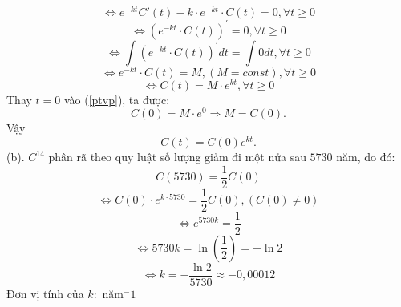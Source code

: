 \documentclass[12pt,a4paper]{article}
\begin{document}
\[ \Leftrightarrow {e^{ - kt}}C'\left( t \right) - k \cdot {e^{ - kt}} \cdot C\left( t \right) = 0,\forall t \ge 0\]
\[ \Leftrightarrow {\left( {{e^{ - kt}} \cdot C\left( t \right)} \right)^\prime } = 0,\forall t \ge 0\]
\[ \Leftrightarrow \int {{{\left( {{e^{ - kt}} \cdot C\left( t \right)} \right)}^\prime }dt = \int {0dt,} } \forall t \ge 0\]
\[ \Leftrightarrow {e^{ - kt}} \cdot C\left( t \right) = M,\left( {M = const} \right),\forall t \ge 0\]
\begin{equation}  \label{ptvp}
 \Leftrightarrow C\left( t \right) = M \cdot {e^{kt}},\forall t \ge 0
\end{equation} 
Thay \(t = 0\) vào (\ref{ptvp}), ta được:
\[C\left( 0 \right) = M \cdot {e^0} \Rightarrow M = C\left( 0 \right).\]
Vậy \[C\left( t \right) = C\left( 0 \right){e^{kt}}.\]
(b). \(C^{14}\) phân rã theo quy luật số lượng giảm đi một nửa sau \(5730\) năm, do đó:
\[C\left( {5730} \right) = \frac{1}{2}C\left( 0 \right)\]
\[ \Leftrightarrow C\left( 0 \right) \cdot {e^{k \cdot 5730}} = \frac{1}{2}C\left( 0 \right), \left( C \left( 0 \right) \ne 0 \right)\]
\[ \Leftrightarrow {e^{5730k}} = \frac{1}{2}\]
\[ \Leftrightarrow 5730k = \ln \left( {\frac{1}{2}} \right) =  - \ln 2\]
\[ \Leftrightarrow k =  - \frac{{\ln 2}}{{5730}} \approx  - 0,00012\]
Đơn vị tính của \(k:\) năm\(^-1\)
\end{document}
